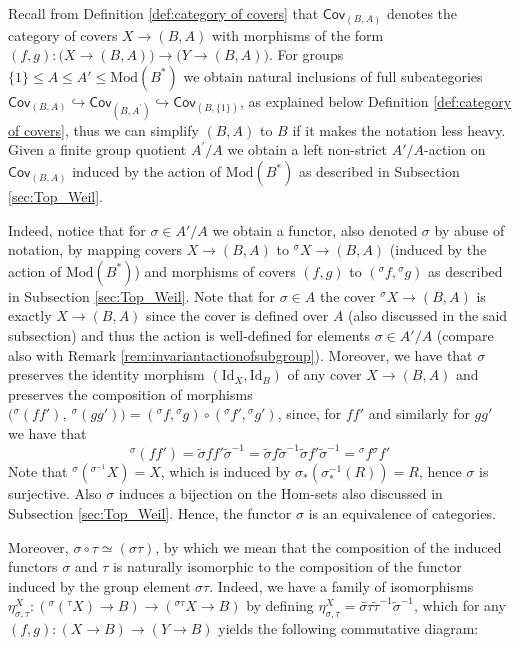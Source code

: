 \documentclass[10pt]{amsart}
\theoremstyle{definition}
\begin{document}
Recall from Definition \ref{def:category of covers} that $\mathsf{Cov}_{(B,A)}$ denotes the category of covers $X \to (B,A)$ with morphisms of the form $(f,g)\colon \big(X\to (B,A)\big) \to \big(Y \to (B,A)\big)$. For groups $\{1\} \leq A \leq A' \leq \mathrm{Mod}(B^*)$ we obtain natural inclusions of full subcategories $\mathsf{Cov}_{(B,A)} \hookrightarrow \mathsf{Cov}_{(B,A ^\prime)} \hookrightarrow \mathsf{Cov}_{(B,\{1\})}$, as explained below Definition \ref{def:category of covers}, thus we can simplify $(B,A)$ to $B$ if it makes the notation less heavy. Given a finite group quotient $A^\prime/A$ we obtain a left non-strict $A'/A $-action on $\mathsf{Cov}_{(B,A)}$ induced by the action of $\mathrm{Mod}(B^*)$ as described in Subsection \ref{sec:Top_Weil}.

Indeed, notice that for $\sigma \in A'/A$ we obtain a functor, also denoted $\sigma$ by abuse of notation, by mapping covers $X \to (B,A)$ to ${^\sigma \! X} \to (B,A)$ (induced by the action of $\mathrm{Mod}(B^*)$) and morphisms of covers $(f,g)$ to $({^\sigma \! f} , {^\sigma \! g})$ as described in Subsection \ref{sec:Top_Weil}. Note that for $\sigma \in A$ the cover ${^\sigma \! X} \to (B,A)$ is exactly $X \to (B,A)$ since the cover is defined over $A$ (also discussed in the said subsection) and thus the action is well-defined for elements $\sigma \in A' /A$ (compare also with Remark \ref{rem:invariantactionofsubgroup}). Moreover, we have that $\sigma $ preserves the identity morphism $(\mathrm{Id}_X , \mathrm{Id}_B)$ of any cover $X \to (B,A)$ and preserves the composition of morphisms $\big( {^\sigma (f f')} , \ {^\sigma (gg')} \big) = ({^\sigma \! f} , {^\sigma \! g}) \circ ({^\sigma \! f'} , {^\sigma \! g'})$, since, for $ff'$ and similarly for $gg'$ we have that
\[
{^\sigma \! (f f')} = \tilde{\sigma} ff' \tilde{\sigma}^{-1} = \tilde{\sigma} f \tilde{\sigma}^{-1} \tilde{\sigma} f' \tilde{\sigma}^{-1} = {^\sigma \! f} {^\sigma \! f'}
\]
Note that ${^\sigma \! ({^{\sigma^{-1}} \! X})} = X $, which is induced by $\sigma_*(\sigma^{-1}_*(R))=R$, hence $\sigma$ is surjective. Also $\sigma$ induces a bijection on the Hom-sets also discussed in Subsection \ref{sec:Top_Weil}. Hence, the functor $\sigma$ is an equivalence of categories.

Moreover, $\sigma \circ \tau \simeq (\sigma \tau)$, by which we mean that the composition of the induced functors $\sigma$ and $\tau$ is naturally isomorphic to the composition of the functor induced by the group element $\sigma\tau$. Indeed, we have a family of isomorphisms $\eta^X_{\sigma, \tau} \colon ({^\sigma \! ({^\tau \! X})} \to B) \to  ({^{\sigma\tau} \! X} \to B) $ by defining $\eta^X_{\sigma, \tau} = \widetilde{\sigma\tau} \tilde{\tau}^{-1} \tilde{\sigma}^{-1}$, which for any $(f,g) \colon (X \to B) \to (Y \to B)$ yields the following commutative diagram:
\end{document}
